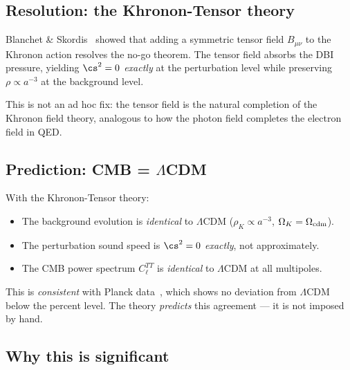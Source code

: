 \subsection{Resolution: the Khronon-Tensor theory}
\label{sec:khronon_tensor}

Blanchet \& Skordis~\cite{BS2025} showed that adding a
symmetric tensor field $B_{\mu\nu}$ to the Khronon action resolves
the no-go theorem.  The tensor field absorbs the DBI pressure,
yielding $\cs^2 = 0$ \emph{exactly} at the perturbation level
while preserving $\rho \propto a^{-3}$ at the background level.

This is not an ad hoc fix: the tensor field is the natural completion
of the Khronon field theory, analogous to how the photon field
completes the electron field in QED.


\subsection{Prediction: CMB = \texorpdfstring{$\Lambda$CDM}{LCDM}}
\label{sec:cmb_prediction}

With the Khronon-Tensor theory:
\begin{itemize}
\item The background evolution is \emph{identical} to $\Lambda$CDM
  ($\rho_K \propto a^{-3}$, $\Omega_K = \Omega_{\rm cdm}$).
\item The perturbation sound speed is $\cs^2 = 0$ \emph{exactly},
  not approximately.
\item The CMB power spectrum $C_\ell^{TT}$ is \emph{identical}
  to $\Lambda$CDM at all multipoles.
\end{itemize}

This is \emph{consistent} with Planck data~\cite{Planck2018}, which
shows no deviation from $\Lambda$CDM below the percent level.  The
theory \emph{predicts} this agreement --- it is not imposed by hand.


\subsection{Why this is significant}
\label{sec:cmb_significance}

